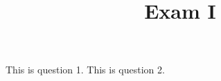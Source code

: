 \documentclass[]{exam}
\title{Exam I}
\begin{document}
\maketitle



\begin{questions}
    \question \label{ {{lbl}} } This is question 1.
    \question \label{ {{lbl}} } This is question 2.
\end{questions}
\end{document}

